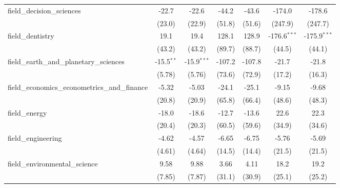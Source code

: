 \begin{tabular}{lcccccc}
   field\_decision\_sciences                                   & -22.7        & -22.6         & -44.2         & -43.6          & -174.0         & -178.6\\   
                                                               & (23.0)       & (22.9)        & (51.8)        & (51.6)         & (247.9)        & (247.7)\\   
   field\_dentistry                                            & 19.1         & 19.4          & 128.1         & 128.9          & -176.6$^{***}$ & -175.9$^{***}$\\   
                                                               & (43.2)       & (43.2)        & (89.7)        & (88.7)         & (44.5)         & (44.1)\\   
   field\_earth\_and\_planetary\_sciences                      & -15.5$^{**}$ & -15.9$^{***}$ & -107.2        & -107.8         & -21.7          & -21.8\\   
                                                               & (5.78)       & (5.76)        & (73.6)        & (72.9)         & (17.2)         & (16.3)\\   
   field\_economics\_econometrics\_and\_finance                & -5.32        & -5.03         & -24.1         & -25.1          & -9.15          & -9.68\\   
                                                               & (20.8)       & (20.9)        & (65.8)        & (66.4)         & (48.6)         & (48.3)\\   
   field\_energy                                               & -18.0        & -18.6         & -12.7         & -13.6          & 22.6           & 22.3\\   
                                                               & (20.4)       & (20.3)        & (60.5)        & (59.6)         & (34.9)         & (34.6)\\   
   field\_engineering                                          & -4.62        & -4.57         & -6.65         & -6.75          & -5.76          & -5.69\\   
                                                               & (4.61)       & (4.64)        & (14.5)        & (14.4)         & (21.5)         & (21.5)\\   
   field\_environmental\_science                               & 9.58         & 9.88          & 3.66          & 4.11           & 18.2           & 19.2\\   
                                                               & (7.85)       & (7.87)        & (31.1)        & (30.9)         & (25.1)         & (25.2)\\   

\end{tabular}
